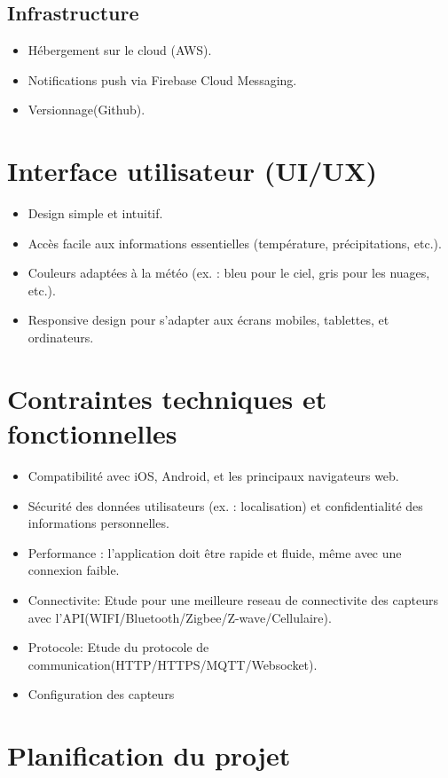 \documentclass[a4paper,12pt]{article}
\begin{document}
\subsection{Infrastructure}
\begin{itemize}
    \item Hébergement sur le cloud (AWS).
    \item Notifications push via Firebase Cloud Messaging.
  \item Versionnage(Github).
\end{itemize}

\section{Interface utilisateur (UI/UX)}
\begin{itemize}
    \item Design simple et intuitif.
    \item Accès facile aux informations essentielles (température, précipitations, etc.).
    \item Couleurs adaptées à la météo (ex. : bleu pour le ciel, gris pour les nuages, etc.).
    \item Responsive design pour s'adapter aux écrans mobiles, tablettes, et ordinateurs.
\end{itemize}

\section{Contraintes techniques et fonctionnelles}
\begin{itemize}
    \item Compatibilité avec iOS, Android, et les principaux navigateurs web.
    \item Sécurité des données utilisateurs (ex. : localisation) et confidentialité des informations personnelles.
    \item Performance : l'application doit être rapide et fluide, même avec une connexion faible.
 \item Connectivite: Etude pour une meilleure reseau de connectivite des capteurs avec l'API(WIFI/Bluetooth/Zigbee/Z-wave/Cellulaire).
 \item Protocole: Etude du protocole de communication(HTTP/HTTPS/MQTT/Websocket).
 \item Configuration des capteurs
\end{itemize}

\section{Planification du projet}
\end{document}

